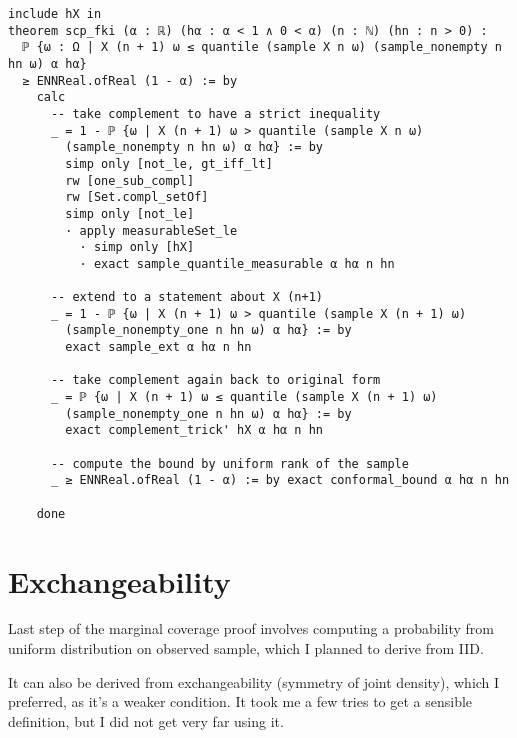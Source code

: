 \documentclass[a4paper, 12pt]{article}
\begin{document}
\begin{lstlisting}
include hX in
theorem scp_fki (α : ℝ) (hα : α < 1 ∧ 0 < α) (n : ℕ) (hn : n > 0) :
  ℙ {ω : Ω | X (n + 1) ω ≤ quantile (sample X n ω) (sample_nonempty n hn ω) α hα}
  ≥ ENNReal.ofReal (1 - α) := by
    calc
      -- take complement to have a strict inequality
      _ = 1 - ℙ {ω | X (n + 1) ω > quantile (sample X n ω)
        (sample_nonempty n hn ω) α hα} := by
        simp only [not_le, gt_iff_lt]
        rw [one_sub_compl]
        rw [Set.compl_setOf]
        simp only [not_le]
        · apply measurableSet_le
          · simp only [hX]
          · exact sample_quantile_measurable α hα n hn

      -- extend to a statement about X (n+1)
      _ = 1 - ℙ {ω | X (n + 1) ω > quantile (sample X (n + 1) ω)
        (sample_nonempty_one n hn ω) α hα} := by
        exact sample_ext α hα n hn

      -- take complement again back to original form
      _ = ℙ {ω | X (n + 1) ω ≤ quantile (sample X (n + 1) ω)
        (sample_nonempty_one n hn ω) α hα} := by
        exact complement_trick' hX α hα n hn

      -- compute the bound by uniform rank of the sample
      _ ≥ ENNReal.ofReal (1 - α) := by exact conformal_bound α hα n hn

    done
\end{lstlisting}


\section*{Exchangeability}

Last step of the marginal coverage proof
involves computing a probability
from uniform distribution on observed sample,
which I planned to derive from IID.

It can also be derived from exchangeability (symmetry of joint density),
which I preferred, as it's a weaker condition.
It took me a few tries to get a sensible definition,
but I did not get very far using it.
\end{document}
